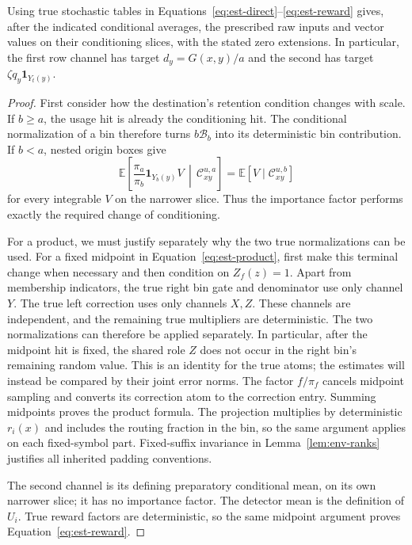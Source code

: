\begin{lemma}\label{lem:est-true-means}
Using true stochastic tables in
Equations~\eqref{eq:est-direct}--\eqref{eq:est-reward} gives, after the
indicated conditional averages, the prescribed raw inputs and vector
values on their conditioning slices, with the stated zero extensions.
In particular, the first row channel has target
$d_y=G(x,y)/a$ and the second has target $\zeta q_y\mathbf1_{Y_t(y)}$.
\end{lemma}
\begin{proof}
First consider how the destination's retention condition changes with scale. If $b\ge a$, the usage hit is already the conditioning hit.  The
conditional normalization of a bin therefore turns $b\mathcal B_b$ into
its deterministic bin contribution.  If $b<a$, nested origin boxes give
\[
 \mathbb E\left[\frac{\pi_a}{\pi_b}\mathbf1_{Y_b(y)}V
                   \,\middle|\,\mathcal C_{xy}^{u,a}\right]
   =\mathbb E[V\mid\mathcal C_{xy}^{u,b}]
\]
for every integrable $V$ on the narrower slice.  Thus the importance factor
performs exactly the required change of conditioning.

For a product, we must justify separately why the two true normalizations can be used. For a fixed midpoint in Equation~\eqref{eq:est-product}, first make this
terminal change when necessary and then condition on $Z_f(z)=1$.
Apart from membership indicators, the true right bin gate and denominator
use only channel $Y$.  The true left correction uses only channels $X,Z$.
These channels are independent, and the remaining true multipliers are
deterministic.  The two normalizations can therefore be applied separately.
In particular, after the midpoint hit is fixed, the shared role $Z$
does not occur in the right bin's remaining random value.  This is an
identity for the true atoms; the estimates will instead be compared by
their joint error norms.
The factor $f/\pi_f$ cancels midpoint sampling and converts its correction
atom to the correction entry.  Summing midpoints proves the product
formula.  The projection multiplies by deterministic $r_i(x)$ and includes
the routing fraction in the bin, so the same argument applies on each
fixed-symbol part.  Fixed-suffix invariance in Lemma~\ref{lem:env-ranks}
justifies all inherited padding conventions.

The second channel is its defining preparatory conditional mean, on its
own narrower slice; it has no importance factor.  The detector mean is
the definition of $U_i$.  True reward factors are deterministic, so the
same midpoint argument proves Equation~\eqref{eq:est-reward}.
\end{proof}

